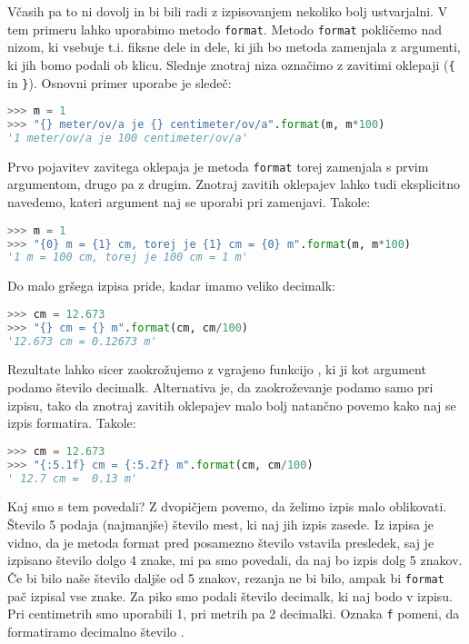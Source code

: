 Včasih pa to ni dovolj in bi bili radi z izpisovanjem nekoliko bolj ustvarjalni. V tem primeru lahko uporabimo metodo \texttt{format}. Metodo \texttt{format} pokličemo nad nizom, ki vsebuje t.i. fiksne dele in dele, ki jih bo metoda zamenjala z argumenti, ki jih bomo podali ob klicu. Slednje znotraj niza označimo z zavitimi oklepaji (\texttt{\{} in \texttt{\}}). Osnovni primer uporabe je sledeč:
\begin{lstlisting}[language=Python, showstringspaces=false]
>>> m = 1
>>> "{} meter/ov/a je {} centimeter/ov/a".format(m, m*100)
'1 meter/ov/a je 100 centimeter/ov/a'
\end{lstlisting}
Prvo pojavitev zavitega oklepaja je metoda \texttt{format} torej zamenjala s prvim argumentom, drugo pa z drugim. Znotraj zavitih oklepajev lahko tudi eksplicitno navedemo, kateri argument naj se uporabi pri zamenjavi. Takole:
\begin{lstlisting}[language=Python, showstringspaces=false]
>>> m = 1
>>> "{0} m = {1} cm, torej je {1} cm = {0} m".format(m, m*100)
'1 m = 100 cm, torej je 100 cm = 1 m'
\end{lstlisting}
Do malo gršega izpisa pride, kadar imamo veliko decimalk:
\begin{lstlisting}[language=Python, showstringspaces=false]
>>> cm = 12.673
>>> "{} cm = {} m".format(cm, cm/100)
'12.673 cm = 0.12673 m'
\end{lstlisting}
Rezultate lahko sicer zaokrožujemo z vgrajeno funkcijo , ki ji kot argument podamo število decimalk. Alternativa je, da zaokroževanje podamo samo pri izpisu, tako da znotraj zavitih oklepajev malo bolj natančno povemo kako naj se izpis formatira. Takole:
\begin{lstlisting}[language=Python, showstringspaces=false]
>>> cm = 12.673
>>> "{:5.1f} cm = {:5.2f} m".format(cm, cm/100)
' 12.7 cm =  0.13 m'
\end{lstlisting}
Kaj smo s tem povedali? Z dvopičjem povemo, da želimo izpis malo oblikovati. Število 5 podaja (najmanjše) število mest, ki naj jih izpis zasede. Iz izpisa je vidno, da je metoda format pred posamezno število vstavila presledek, saj je izpisano število dolgo 4 znake, mi pa smo povedali, da naj bo izpis dolg 5 znakov. Če bi bilo naše število daljše od 5 znakov, rezanja ne bi bilo, ampak bi \texttt{format} pač izpisal vse znake. Za piko smo podali število decimalk, ki naj bodo v izpisu. Pri centimetrih smo uporabili 1, pri metrih pa 2 decimalki. Oznaka \texttt{f} pomeni, da formatiramo decimalno število .

